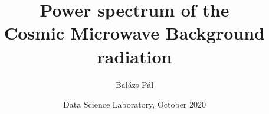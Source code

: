 \title[Cosmic Microwave Background]
{Power spectrum of the\\Cosmic Microwave Background radiation}


\author[Balázs Pál]
{Balázs Pál}


\date[ELTE 2020]
{Data Science Laboratory, October 2020}

